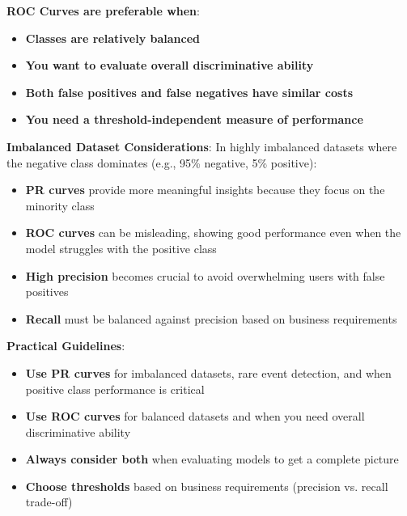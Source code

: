 \textbf{ROC Curves are preferable when}:
\begin{itemize}
	\item \textbf{Classes are relatively balanced}
	\item \textbf{You want to evaluate overall discriminative ability}
	\item \textbf{Both false positives and false negatives have similar costs}
	\item \textbf{You need a threshold-independent measure of performance}
\end{itemize}

\textbf{Imbalanced Dataset Considerations}:
In highly imbalanced datasets where the negative class dominates (e.g., 95\% negative, 5\% positive):

\begin{itemize}
	\item \textbf{PR curves} provide more meaningful insights because they focus on the minority class
	\item \textbf{ROC curves} can be misleading, showing good performance even when the model struggles with the positive class
	\item \textbf{High precision} becomes crucial to avoid overwhelming users with false positives
	\item \textbf{Recall} must be balanced against precision based on business requirements
\end{itemize}

\textbf{Practical Guidelines}:
\begin{itemize}
	\item \textbf{Use PR curves} for imbalanced datasets, rare event detection, and when positive class performance is critical
	\item \textbf{Use ROC curves} for balanced datasets and when you need overall discriminative ability
	\item \textbf{Always consider both} when evaluating models to get a complete picture
	\item \textbf{Choose thresholds} based on business requirements (precision vs. recall trade-off)
\end{itemize}


